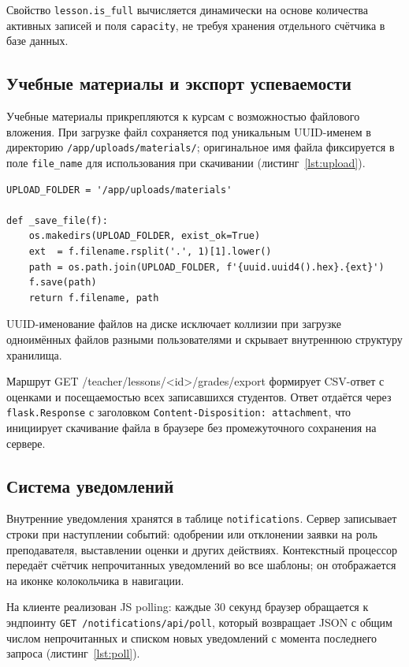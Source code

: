 Свойство \texttt{lesson.is\_full} вычисляется динамически на основе
количества активных записей и поля \texttt{capacity}, не требуя
хранения отдельного счётчика в базе данных.

\subsection{Учебные материалы и экспорт успеваемости}

Учебные материалы прикрепляются к курсам с возможностью файлового
вложения. При загрузке файл сохраняется под уникальным UUID-именем
в директорию \texttt{/app/uploads/materials/}; оригинальное имя файла
фиксируется в поле \texttt{file\_name} для использования при скачивании
(листинг~\ref{lst:upload}).

\begin{lstlisting}[caption={Сохранение загружаемого файла (app/main/routes.py)}, label={lst:upload}]
UPLOAD_FOLDER = '/app/uploads/materials'

def _save_file(f):
    os.makedirs(UPLOAD_FOLDER, exist_ok=True)
    ext  = f.filename.rsplit('.', 1)[1].lower()
    path = os.path.join(UPLOAD_FOLDER, f'{uuid.uuid4().hex}.{ext}')
    f.save(path)
    return f.filename, path
\end{lstlisting}

UUID-именование файлов на диске исключает коллизии при загрузке
одноимённых файлов разными пользователями и скрывает внутреннюю
структуру хранилища.

Маршрут GET /teacher/lessons/<id>/grades/export формирует
CSV-ответ с оценками и посещаемостью всех записавшихся студентов.
Ответ отдаётся через \texttt{flask.Response} с заголовком
\texttt{Content-Disposition: attachment}, что инициирует скачивание
файла в браузере без промежуточного сохранения на сервере.

\subsection{Система уведомлений}

Внутренние уведомления хранятся в таблице \texttt{notifications}.
Сервер записывает строки при наступлении событий: одобрении или
отклонении заявки на роль преподавателя, выставлении оценки и других
действиях. Контекстный процессор передаёт счётчик непрочитанных
уведомлений во все шаблоны; он отображается на иконке колокольчика
в навигации.

На клиенте реализован JS polling: каждые 30 секунд браузер
обращается к эндпоинту \texttt{GET /notifications/api/poll}, который
возвращает JSON с общим числом непрочитанных и списком новых уведомлений
с момента последнего запроса (листинг~\ref{lst:poll}).


